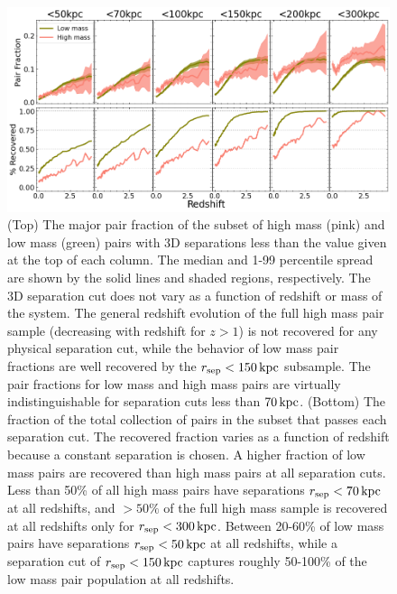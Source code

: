 \documentclass[twocolumn]{aastex631}
\begin{document}
    \begin{figure}[htp]
        \centering
        \includegraphics[width=\textwidth]{pairfrac_sepcut.png}
        \caption{%
        (Top) The major pair fraction of the subset of high mass (pink) and low mass (green) pairs with 3D separations less than the value given at the top of each column. 
        The median and 1-99 percentile spread are shown by the solid lines and shaded regions, respectively. 
        The 3D separation cut does not vary as a function of redshift or mass of the system. 
        The general redshift evolution of the full high mass pair sample (decreasing with redshift for $z>1$) is not recovered for any physical separation cut, while the behavior of low mass pair fractions are well recovered by the $r_{\mathrm{sep}}<150\mathrm{\,kpc}$ subsample.
        The pair fractions for low mass and high mass pairs are virtually indistinguishable for separation cuts less than $70\mathrm{\,kpc}$. 
        (Bottom) The fraction of the total collection of pairs in the subset that passes each separation cut. 
        The recovered fraction varies as a function of redshift because a constant separation is chosen. 
        A higher fraction of low mass pairs are recovered than high mass pairs at all separation cuts. 
        Less than 50\% of all high mass pairs have separations $r_{\mathrm{sep}}<70\mathrm{\,kpc}$ at all redshifts, and $>50\%$ of the full high mass sample is recovered at all redshifts only for $r_{\mathrm{sep}}<300\mathrm{\,kpc}$. 
        Between 20-60\% of low mass pairs have separations $r_{\mathrm{sep}}<50\mathrm{\,kpc}$ at all redshifts, while a separation cut of $r_{\mathrm{sep}}<150\mathrm{\,kpc}$ captures roughly 50-100\% of the low mass pair population at all redshifts. 
        }
      \label{fig:sepcut}
    \end{figure}
\end{document}
